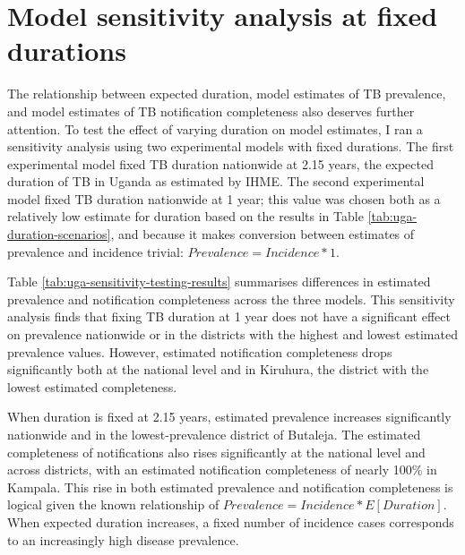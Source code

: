 \documentclass[
]{report}
\begin{document}
\hypertarget{model-sensitivity-analysis-at-fixed-durations}{%
\section*{Model sensitivity analysis at fixed durations}\label{model-sensitivity-analysis-at-fixed-durations}}

The relationship between expected duration, model estimates of TB prevalence, and model estimates of TB notification completeness also deserves further attention. To test the effect of varying duration on model estimates, I ran a sensitivity analysis using two experimental models with fixed durations. The first experimental model fixed TB duration nationwide at 2.15 years, the expected duration of TB in Uganda as estimated by IHME.\autocite{Ledesma2021} The second experimental model fixed TB duration nationwide at 1 year; this value was chosen both as a relatively low estimate for duration based on the results in Table \ref{tab:uga-duration-scenarios}, and because it makes conversion between estimates of prevalence and incidence trivial: \(Prevalence = Incidence * 1\).

Table \ref{tab:uga-sensitivity-testing-results} summarises differences in estimated prevalence and notification completeness across the three models. This sensitivity analysis finds that fixing TB duration at 1 year does not have a significant effect on prevalence nationwide or in the districts with the highest and lowest estimated prevalence values. However, estimated notification completeness drops significantly both at the national level and in Kiruhura, the district with the lowest estimated completeness.

When duration is fixed at 2.15 years, estimated prevalence increases significantly nationwide and in the lowest-prevalence district of Butaleja. The estimated completeness of notifications also rises significantly at the national level and across districts, with an estimated notification completeness of nearly 100\% in Kampala. This rise in both estimated prevalence and notification completeness is logical given the known relationship of \(Prevalence = Incidence * E[Duration]\). When expected duration increases, a fixed number of incidence cases corresponds to an increasingly high disease prevalence.
\end{document}
